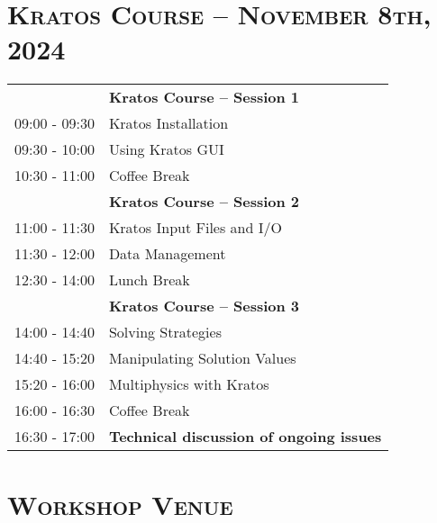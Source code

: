 \documentclass{article}
\begin{document}
\newpage
\section*{\centering \textsc{Kratos Course -- November 8th, 2024}}

\begin{table}[h]\centering
   \begin{tabularx}{0.85\textwidth}{r|X}
      \toprule%
                    & {\large \textbf{Kratos Course -- Session 1}} \\%
      09:00 - 09:30 & Kratos Installation \\%
      09:30 - 10:00 & Using Kratos GUI \\%
      \midrule%
      \rowcolor{SeaGreen3!5!} 10:30 - 11:00 & Coffee Break \\%
      \midrule%
                    & {\large \textbf{Kratos Course -- Session 2}} \\%
      11:00 - 11:30 & Kratos Input Files and I/O \\%
      11:30 - 12:00 & Data Management \\%
      \midrule%
      \rowcolor{SeaGreen3!5!} 12:30 - 14:00 & Lunch Break \\%
      \midrule%
                    & {\large \textbf{Kratos Course -- Session 3}} \\%
      14:00 - 14:40 & Solving Strategies \\%
      14:40 - 15:20 & Manipulating Solution Values \\%
      15:20 - 16:00 & Multiphysics with Kratos \\%
      \midrule%
      \rowcolor{SeaGreen3!5!} 16:00 - 16:30 & Coffee Break \\%
      \midrule%
      16:30 - 17:00 & {\large \textbf{Technical discussion of ongoing issues}} \\%
      \bottomrule
   \end{tabularx}
\end{table}

\newpage
\section*{\centering \textsc{Workshop Venue}}
\end{document}
